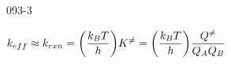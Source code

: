 \begin{mitframe}{093-3}
\begin{listone}
	\item $\thermcond_{eff}\approx\thermcond_{rxn}=\bigg(\dfrac{\thermcond_{\exergy}\Temp}{\heattranscoeff}\bigg)\dilfac^{\neq}=\bigg(\dfrac{\thermcond_{\exergy}\Temp}{\heattranscoeff}\bigg)\dfrac{\heatflow^{\neq}}{\heatflow_{\helmholtz}\heatflow_{\exergy}}$
\end{listone}            
\end{mitframe}